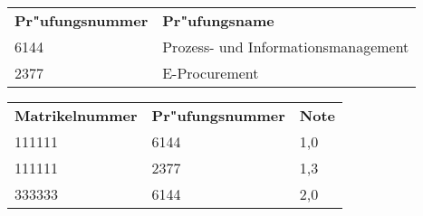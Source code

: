 \begin{tabular}{ l l }
    \hline
    \rowcolor{LightSlateGrey}
    \textbf{Pr"ufungsnummer}    & \textbf{Pr"ufungsname}\\
    6144                        & Prozess- und Informationsmanagement\\
    2377                        & E-Procurement\\
\end{tabular}

\vspace{1cm}

\begin{tabular}{ l l l }
    \hline
    \rowcolor{LightSlateGrey}
    \textbf{Matrikelnummer} & \textbf{Pr"ufungsnummer}  & \textbf{Note}\\
    111111                  & 6144                      & 1,0\\
    111111                  & 2377                      & 1,3\\
    333333                  & 6144                      & 2,0\\
\end{tabular}


